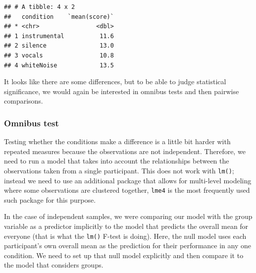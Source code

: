 \documentclass[
]{book}
\begin{document}
\begin{verbatim}
## # A tibble: 4 x 2
##   condition    `mean(score)`
## * <chr>                <dbl>
## 1 instrumental          11.6
## 2 silence               13.0
## 3 vocals                10.8
## 4 whiteNoise            13.5
\end{verbatim}

It looks like there are some differences, but to be able to judge statistical significance, we would again be interested in omnibus tests and then pairwise comparisons.

\hypertarget{omnibus-test}{%
\subsubsection{Omnibus test}\label{omnibus-test}}

Testing whether the conditions make a difference is a little bit harder with repeated measures because the observations are not independent. Therefore, we need to run a model that takes into account the relationships between the observations taken from a single participant. This does not work with \texttt{lm()}; instead we need to use an additional package that allows for multi-level modeling where some observations are clustered together, \texttt{lme4} is the most frequently used such package for this purpose.

In the case of independent samples, we were comparing our model with the group variable as a predictor implicitly to the model that predicts the overall mean for everyone (that is what the \texttt{lm()} F-test is doing). Here, the null model uses each participant's own overall mean as the prediction for their performance in any one condition. We need to set up that null model explicitly and then compare it to the model that considers groups.
\end{document}
